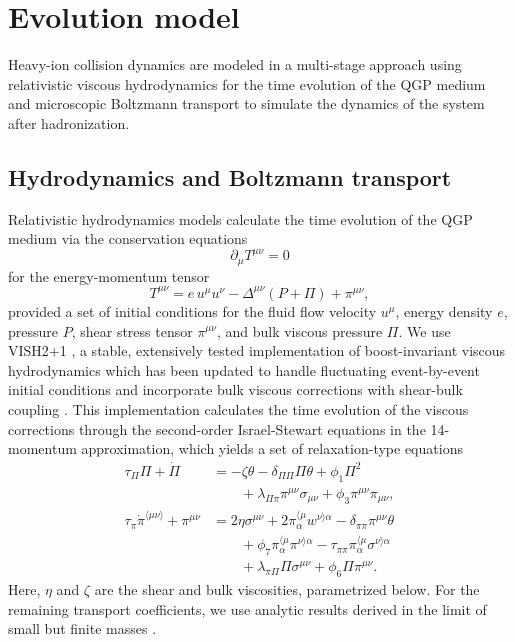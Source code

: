 \documentclass[aps,prc,reprint,amsmath,nofootinbib]{revtex4-1}
\begin{document}
\section{Evolution model}

Heavy-ion collision dynamics are modeled in a multi-stage approach using relativistic viscous hydrodynamics for the time evolution of the QGP medium and microscopic Boltzmann transport to simulate the dynamics of the system after hadronization.

\subsection{Hydrodynamics and Boltzmann transport}

Relativistic hydrodynamics models calculate the time evolution of the QGP medium via the conservation equations
\begin{equation}
  \partial_\mu T^{\mu\nu} = 0
  \label{eq:conservation}
\end{equation}
for the energy-momentum tensor
\begin{equation}
  T^{\mu\nu} = e \, u^\mu u^\nu  - \Delta^{\mu\nu} (P + \Pi) + \pi^{\mu\nu},
\end{equation}
provided a set of initial conditions for the fluid flow velocity $u^\mu$, energy density $e$, pressure $P$, shear stress tensor $\pi^{\mu\nu}$, and bulk viscous pressure $\Pi$.
We use VISH2+1 \cite{Song:2007ux}, a stable, extensively tested implementation of boost-invariant viscous hydrodynamics which has been updated to handle fluctuating event-by-event initial conditions \cite{Shen:2014vra} and incorporate bulk viscous corrections with shear-bulk coupling \cite{Liu:2015bik}.
This implementation calculates the time evolution of the viscous corrections through the second-order Israel-Stewart equations \cite{Israel:1979wp, Israel:1976aa} in the 14-momentum approximation, which yields a set of relaxation-type equations \cite{Denicol:2014vaa}
\begin{subequations}
  \label{eq:relaxation}
  \begin{align}
    \tau_\Pi \Pi + \dot{\Pi} &=
      -\zeta \theta - \delta_{\Pi\Pi} \Pi\theta + \phi_1 \Pi^2 \nonumber \\
      &\qquad + \lambda_{\Pi\pi} \pi^{\mu\nu} \sigma_{\mu\nu}
      + \phi_3 \pi^{\mu\nu}\pi_{\mu\nu}, \\
    \tau_\pi \dot{\pi}^{\langle \mu\nu \rangle} + \pi^{\mu\nu} &=
      2\eta\sigma^{\mu\nu} + 2\pi_\alpha^{\langle \mu} w^{\nu \rangle \alpha}
      - \delta_{\pi\pi} \pi^{\mu\nu} \theta \nonumber \\
      &\qquad + \phi_7 \pi_\alpha^{\langle \mu} \pi^{\nu \rangle \alpha}
      - \tau_{\pi\pi} \pi_\alpha^{\langle \mu}\sigma^{\nu \rangle \alpha} \nonumber \\
      &\qquad + \lambda_{\pi\Pi} \Pi \sigma^{\mu\nu} + \phi_6 \Pi \pi^{\mu\nu}.
  \end{align}
\end{subequations}
Here, $\eta$ and $\zeta$ are the shear and bulk viscosities, parametrized below.
For the remaining transport coefficients, we use analytic results derived in the limit of small but finite masses \cite{Denicol:2014vaa}.
\end{document}
